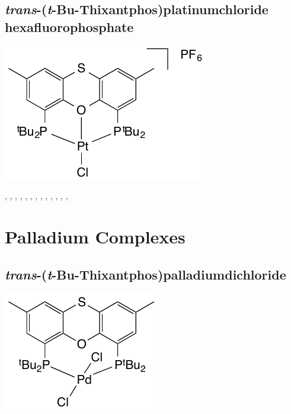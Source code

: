 \subsection*{\emph{trans}-(\emph{t}-Bu-Thixantphos)platinumchloride hexafluorophosphate}
\begin{structure}[h]
\begin{center}
\includegraphics{../Structures/StBuPtClPF6.pdf}
\end{center}
\end{structure}

,
,
,
,
,
,
,
,
,
,
,
,
,

\section{Palladium Complexes}
\label{section:experimental:palladium}

\subsection*{\emph{trans}-(\emph{t}-Bu-Thixantphos)palladiumdichloride}
\begin{structure}[h]
\begin{center}
\includegraphics{../Structures/StBuPdCl2.pdf}
\end{center}
\end{structure}


